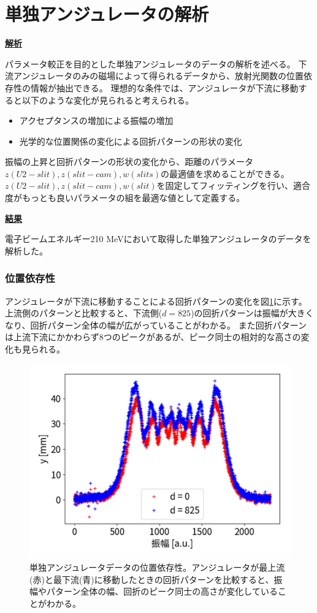 \documentclass[a4paper,11pt,uplatex]{jsbook}
\begin{document}
\section{単独アンジュレータの解析}
\noindent \textbf{\underline{解析}}\par
パラメータ較正を目的とした単独アンジュレータのデータの解析を述べる。
下流アンジュレータのみの磁場によって得られるデータから、放射光関数の位置依存性の情報が抽出できる。
理想的な条件では、アンジュレータが下流に移動すると以下のような変化が見られると考えられる。
\begin{itemize}
  \item アクセプタンスの増加による振幅の増加
  \item 光学的な位置関係の変化による回折パターンの形状の変化
\end{itemize}

振幅の上昇と回折パターンの形状の変化から、距離のパラメータ $z(U2-slit),z(slit-cam),w(slits)$の最適値を求めることができる。
$z(U2-slit),z(slit-cam),w(slit)$を固定してフィッティングを行い、適合度がもっとも良いパラメータの組を最適な値として定義する。

\noindent \textbf{\underline{結果}}\par
電子ビームエネルギー210 MeVにおいて取得した単独アンジュレータのデータを解析した。
\subsubsection{位置依存性}
アンジュレータが下流に移動することによる回折パターンの変化を図\ref{DCposdep}に示す。上流側のパターンと比較すると、下流側($d= 825$)の回折パターンは振幅が大きくなり、回折パターン全体の幅が広がっていることがわかる。
また回折パターンは上流下流にかかわらず8つのピークがあるが、ピーク同士の相対的な高さの変化も見られる。
\begin{figure}
  \centering
  \includegraphics[width=0.8\linewidth]{image/4-DCposdep.png}
  \caption[アンジュレータ位置依存性]{単独アンジュレータデータの位置依存性。アンジュレータが最上流(赤)と最下流(青)に移動したときの回折パターンを比較すると、振幅やパターン全体の幅、回折のピーク同士の高さが変化していることがわかる。}\label{DCposdep}
\end{figure}
\end{document}
